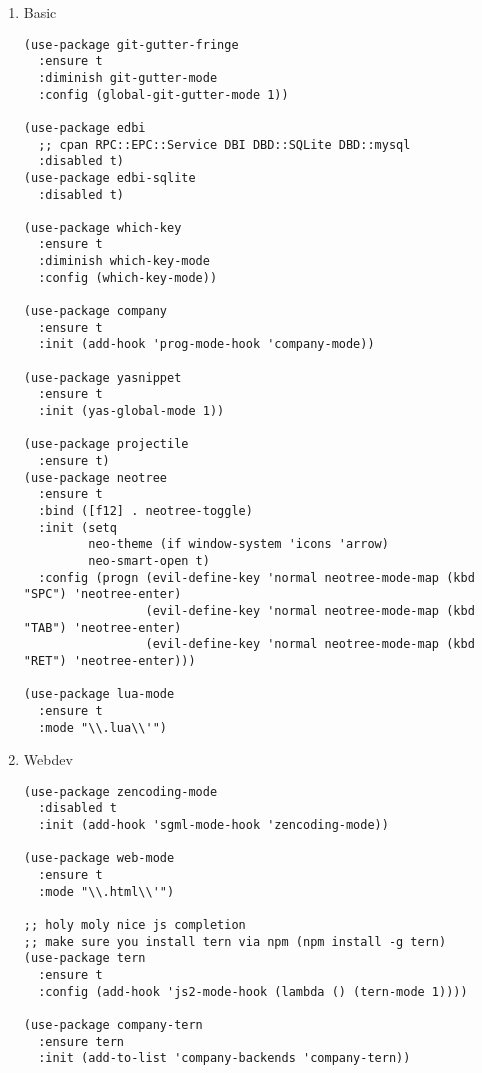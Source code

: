 \documentclass[11pt]{article}
\begin{document}
\begin{enumerate}
\item Basic
\label{sec-1-2-2-1}

\begin{verbatim}
(use-package git-gutter-fringe
  :ensure t
  :diminish git-gutter-mode
  :config (global-git-gutter-mode 1))

(use-package edbi
  ;; cpan RPC::EPC::Service DBI DBD::SQLite DBD::mysql
  :disabled t)
(use-package edbi-sqlite
  :disabled t)

(use-package which-key
  :ensure t
  :diminish which-key-mode
  :config (which-key-mode))

(use-package company
  :ensure t
  :init (add-hook 'prog-mode-hook 'company-mode))

(use-package yasnippet
  :ensure t
  :init (yas-global-mode 1))

(use-package projectile
  :ensure t)
(use-package neotree
  :ensure t
  :bind ([f12] . neotree-toggle)
  :init (setq
         neo-theme (if window-system 'icons 'arrow)
         neo-smart-open t)
  :config (progn (evil-define-key 'normal neotree-mode-map (kbd "SPC") 'neotree-enter)
                 (evil-define-key 'normal neotree-mode-map (kbd "TAB") 'neotree-enter)
                 (evil-define-key 'normal neotree-mode-map (kbd "RET") 'neotree-enter)))

(use-package lua-mode
  :ensure t
  :mode "\\.lua\\'")
\end{verbatim}

\item Webdev
\label{sec-1-2-2-2}

\begin{verbatim}
(use-package zencoding-mode
  :disabled t
  :init (add-hook 'sgml-mode-hook 'zencoding-mode))

(use-package web-mode
  :ensure t
  :mode "\\.html\\'")

;; holy moly nice js completion
;; make sure you install tern via npm (npm install -g tern)
(use-package tern
  :ensure t
  :config (add-hook 'js2-mode-hook (lambda () (tern-mode 1))))

(use-package company-tern
  :ensure tern
  :init (add-to-list 'company-backends 'company-tern))


\end{verbatim}
\end{enumerate}
\end{document}
